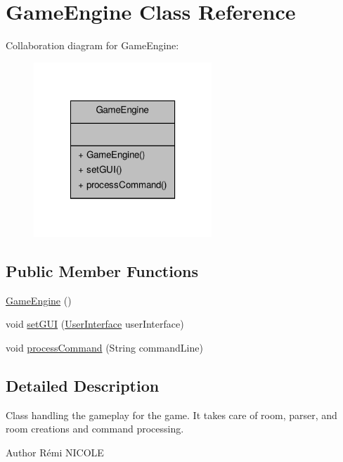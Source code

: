 \hypertarget{classGameEngine}{\section{Game\-Engine Class Reference}
\label{classGameEngine}
}


Collaboration diagram for Game\-Engine\-:\nopagebreak
\begin{figure}[H]
\begin{center}
\leavevmode
\includegraphics[width=190pt]{classGameEngine__coll__graph}
\end{center}
\end{figure}
\subsection*{Public Member Functions}
\begin{DoxyCompactItemize}
\item 
\hyperlink{classGameEngine_a9e8a92f5021a34293060f9aaff4005de}{Game\-Engine} ()
\item 
void \hyperlink{classGameEngine_aec901a5b590b3cd204f196165da5dfb6}{set\-G\-U\-I} (\hyperlink{classUserInterface}{User\-Interface} user\-Interface)
\item 
void \hyperlink{classGameEngine_ad7133885f313fa99bca3bb7cb8272f64}{process\-Command} (String command\-Line)
\end{DoxyCompactItemize}


\subsection{Detailed Description}
Class handling the gameplay for the game. It takes care of room, parser, and room creations and command processing.

\begin{DoxyAuthor}{Author}
Rémi N\-I\-C\-O\-L\-E 
\end{DoxyAuthor}


